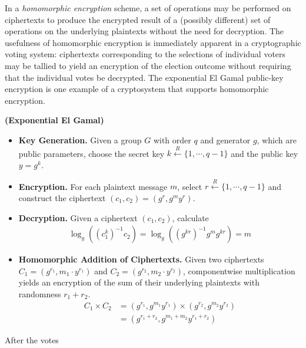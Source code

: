 In a \emph{homomorphic encryption} scheme, a set of operations may be performed on ciphertexts to produce the encrypted result of a (possibly different) set of operations on the underlying plaintexts without the need for decryption. The usefulness of homomorphic encryption is immediately apparent in a cryptographic voting system: ciphertexts corresponding to the selections of individual voters may be tallied to yield an encryption of the election outcome without requiring that the individual votes be decrypted. The exponential El Gamal public-key encryption is one example of a cryptosystem that supports homomorphic encryption.
\begin{definition}
\textbf{(Exponential El Gamal)}
\begin{itemize}
\item \textbf{Key Generation.} Given a group $G$ with order $q$ and generator $g$, which are public parameters, choose the secret key $k \xleftarrow{R} \{1, \cdots, q-1\}$ and the public key $y = g^k$.
\item \textbf{Encryption.} For each plaintext message $m$, select $r \xleftarrow{R} \{1, \cdots, q-1\}$ and construct the ciphertext $(c_1, c_2) = (g^r, g^m y^r)$.
\item \textbf{Decryption.} Given a ciphertext $(c_1, c_2)$, calculate
\begin{align*}
\log_g\left((c_1^k)^{-1} c_2\right) = \log_g\left((g^{kr})^{-1} g^m g^{kr}\right) = m
\end{align*}
\item \textbf{Homomorphic Addition of Ciphertexts.} Given two ciphertexts $C_1 = (g^{r_1}, m_1 \cdot y^{r_1})$ and $C_2 = (g^{r_2}, m_2 \cdot y^{r_2})$, componentwise multiplication yields an encryption of the sum of their underlying plaintexts with randomness $r_1 + r_2$.
\begin{align*}
C_1 \times C_2 &= (g^{r_1}, g^{m_1} y^{r_1}) \times (g^{r_2}, g^{m_2} y^{r_2}) \\
&= (g^{r_1 + r_2}, g^{m_1 + m_2} y^{r_1 + r_2})
\end{align*}
\end{itemize}
\end{definition}

After the votes


